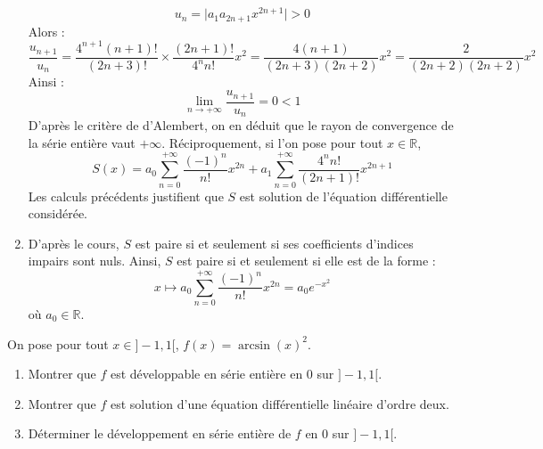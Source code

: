 \documentclass[a4paper,10pt]{report}
\begin{document}
\begin{enumerate}
$$ u_n = \vert a_1 a_{2n+1} x^{2n+1} \vert >0$$
Alors :
$$ \dfrac{u_{n+1}}{u_n} = \dfrac{4^{n+1} (n+1)!}{(2n+3)!} \times \dfrac{(2n+1)!}{4^n n!} x^2 = \dfrac{4 (n+1)}{(2n+3)(2n+2)}x^2 = \dfrac{2}{(2n+2)(2n+2)} x^2$$
Ainsi :
$$ \lim_{n \rightarrow + \infty} \dfrac{u_{n+1}}{u_n} = 0<1$$
D'après le critère de d'Alembert, on en déduit que le rayon de convergence de la série entière vaut $+ \infty$. Réciproquement, si l'on pose pour tout $x \in \mathbb{R}$,
$$ S(x) = a_0 \sum_{n=0}^{+ \infty} \dfrac{(-1)^n}{n!} x^{2n} + a_1 \sum_{n=0}^{+ \infty} \dfrac{4^n n!}{(2n+1)!} x^{2n+1}$$
Les calculs précédents justifient que $S$ est solution de l'équation différentielle considérée.
\item D'après le cours, $S$ est paire si et seulement si ses coefficients d'indices impairs sont nuls. Ainsi, $S$ est paire si et seulement si elle est de la forme : 
$$ x \mapsto a_0 \sum_{n=0}^{+ \infty} \dfrac{(-1)^n}{n!} x^{2n} = a_0 e^{-x^2}$$
où $a_0 \in \mathbb{R}$.
\end{enumerate}

\begin{Exa} On pose pour tout $x \in ]-1,1[$, $f(x) = \arcsin(x)^2$.

\begin{enumerate}
\item Montrer que $f$ est développable en série entière en $0$ sur $]-1,1[$.
\item Montrer que $f$ est solution d'une équation différentielle linéaire d'ordre deux.
\item Déterminer le développement en série entière de $f$ en $0$ sur $]-1,1[$.
\end{enumerate}
\end{Exa}

\corr 
\end{document}
